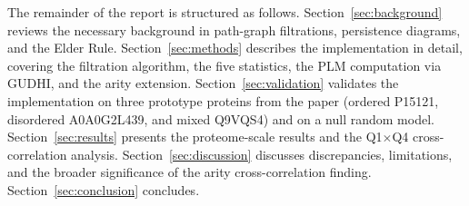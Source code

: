 The remainder of the report is structured as follows.
Section~\ref{sec:background} reviews the necessary background in
path-graph filtrations, persistence diagrams, and the Elder Rule.
Section~\ref{sec:methods} describes the implementation in detail, covering
the filtration algorithm, the five statistics, the PLM computation via
GUDHI, and the arity extension.
Section~\ref{sec:validation} validates the implementation on three
prototype proteins from the paper (ordered P15121, disordered
A0A0G2L439, and mixed Q9VQS4) and on a null random model.
Section~\ref{sec:results} presents the proteome-scale results and the
Q1$\times$Q4 cross-correlation analysis.
Section~\ref{sec:discussion} discusses discrepancies, limitations, and
the broader significance of the arity cross-correlation finding.
Section~\ref{sec:conclusion} concludes.
